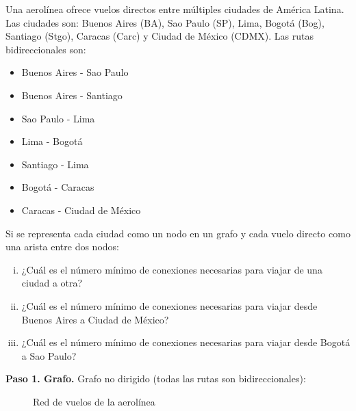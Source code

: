 \begin{prob} 
Una aerolínea ofrece vuelos directos entre múltiples ciudades de América Latina. Las ciudades son: Buenos Aires (BA), Sao Paulo (SP), Lima, Bogotá (Bog), Santiago (Stgo), Caracas (Carc) y Ciudad de México (CDMX). Las rutas bidireccionales son:
\begin{itemize}
\item Buenos Aires - Sao Paulo
\item Buenos Aires - Santiago
\item Sao Paulo - Lima
\item Lima - Bogotá
\item Santiago - Lima
\item Bogotá - Caracas
\item Caracas - Ciudad de México
\end{itemize}

Si se representa cada ciudad como un nodo en un grafo y cada vuelo directo como una arista entre dos nodos:
\begin{enumerate}[i.]
\item ¿Cuál es el número mínimo de conexiones necesarias para viajar de una ciudad a otra?
\item ¿Cuál es el número mínimo de conexiones necesarias para viajar desde Buenos Aires a Ciudad de México?
\item ¿Cuál es el número mínimo de conexiones necesarias para viajar desde Bogotá a Sao Paulo?
\end{enumerate}

\begin{myproof}
\textbf{Paso 1. Grafo.} Grafo no dirigido (todas las rutas son bidireccionales):

\begin{figure}[H]
\centering
{}
\caption{Red de vuelos de la aerolínea}
\label{fig:red_vuelos}
\end{figure}


\end{myproof}
\end{prob}
